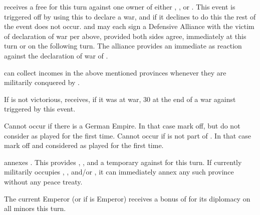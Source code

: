\newpage\startevents






\phdipl
\aparag \FRA receives a free \CB for this turn against one owner of either
\provincePicardie, \provinceArtois, \provinceFlandre or \provinceHainaut.
This event is triggered off by \FRA using this \CB to declare a war, and if it
declines to do this the rest of the event does not occur.
\aparag \HOL and \ENG may each sign a Defensive Alliance with the victim of
\FRA declaration of war per above, provided both sides agree, immediately at
this turn or on the following turn.  The alliance provides an immediate \CB as
reaction against the declaration of war of \FRA.

\phadm
\aparag \FRA can collect incomes in the above mentioned provinces whenever
they are militarily conquered by \FRA.

\phpaix
\aparag If \FRA is not victorious, \HOL receives, if it was at war, 30 \PV at
the end of a war against \FRA triggered by this event.





\condition{}
\aparag Cannot occur if there is a German Empire. In that case mark off, but
do not consider as played for the first time.
\aparag Cannot occur if \provinceAlsace is not part of \paysAlsace.  In that
case mark off and considered as played for the first time.

\phevnt
\aparag \FRA annexes \provinceAlsace. This provides \SPA, \HOL, \ENG and \AUS
a temporary \CB against \FRA for this turn.
\aparag If \FRA currently militarily occupies \provincePicardie,
\provinceRosselo,  and/or \provinceArtois, it can
immediately annex any such province without any peace treaty.

\phdipl
\aparag The current Emperor (or \SPA if \AUSmin is Emperor) receives a bonus
of  for its diplomacy on all \HRE minors this turn.




